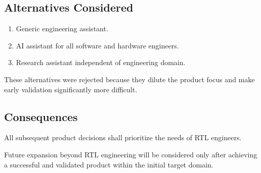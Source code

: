 \subsection*{Alternatives Considered}

\begin{enumerate}
    \item Generic engineering assistant.
    \item AI assistant for all software and hardware engineers.
    \item Research assistant independent of engineering domain.
\end{enumerate}

These alternatives were rejected because they dilute the product focus and make early validation significantly more difficult.

\subsection*{Consequences}

All subsequent product decisions shall prioritize the needs of RTL engineers.

Future expansion beyond RTL engineering will be considered only after achieving a successful and validated product within the initial target domain.